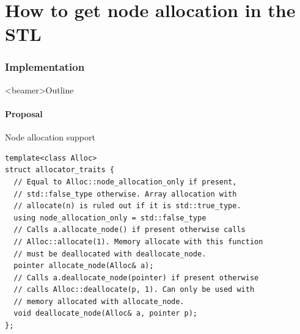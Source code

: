 \documentclass[10pt,aspectratio=169]{beamer}
\def\nodeU{\node[style=nodeU]}
\def\nodeD{\node[style=nodeD]}
\def\nodeQ{\node[style=nodeQ]}
\def\nodeO{\node[style=nodeO]}
\def\valueU{\node[style=valueU]}
\def\valueD{\node[style=valueD]}
\def\valueQ{\node[style=valueQ]}
\def\valueO{\node[style=valueO]}
\begin{document}
%
%
%
%
%
%

\part{How to get node allocation in the STL}

\section[Implementation]{Implementation}

\begin{frame}<beamer>{Outline}
\end{frame}

\subsection[Proposal]{Proposal}
\begin{frame}[fragile]{Node allocation support}

\begin{lstlisting}
template<class Alloc>
struct allocator_traits {
  // Equal to Alloc::node_allocation_only if present,
  // std::false_type otherwise. Array allocation with
  // allocate(n) is ruled out if it is std::true_type.
  using node_allocation_only = std::false_type
  // Calls a.allocate_node() if present otherwise calls
  // Alloc::allocate(1). Memory allocate with this function
  // must be deallocated with deallocate_node.
  pointer allocate_node(Alloc& a);
  // Calls a.deallocate_node(pointer) if present otherwise
  // calls Alloc::deallocate(p, 1). Can only be used with
  // memory allocated with allocate_node.
  void deallocate_node(Alloc& a, pointer p);
};
\end{lstlisting}

\end{frame}
\end{document}
